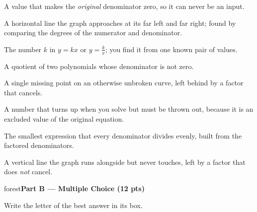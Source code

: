 \documentclass[10pt]{article}
\newcommand{\parthead}[1]{%
  \vspace{6pt}\noindent
  \begin{headlinebox}{forest}\color{white}\bfseries #1\end{headlinebox}%
  \vspace{4pt}}
\begin{document}
\hfill
\begin{minipage}[t]{0.57\textwidth}
\small
\begin{description}[leftmargin=1.4em, itemsep=3pt]
  \item[(A)] A value that makes the \emph{original} denominator zero, so it can never be an input.
  \item[(B)] A horizontal line the graph approaches at its far left and far right; found by comparing the degrees of the numerator and denominator.
  \item[(C)] The number $k$ in $y=kx$ or $y=\frac{k}{x}$; you find it from one known pair of values.
  \item[(D)] A quotient of two polynomials whose denominator is not zero.
  \item[(E)] A single missing point on an otherwise unbroken curve, left behind by a factor that cancels.
  \item[(F)] A number that turns up when you solve but must be thrown out, because it is an excluded value of the original equation.
  \item[(G)] The smallest expression that every denominator divides evenly, built from the factored denominators.
  \item[(H)] A vertical line the graph runs alongside but never touches, left by a factor that does \emph{not} cancel.
\end{description}
\end{minipage}

\parthead{Part B --- Multiple Choice (12 pts)}
Write the letter of the best answer in its box.
\end{document}
